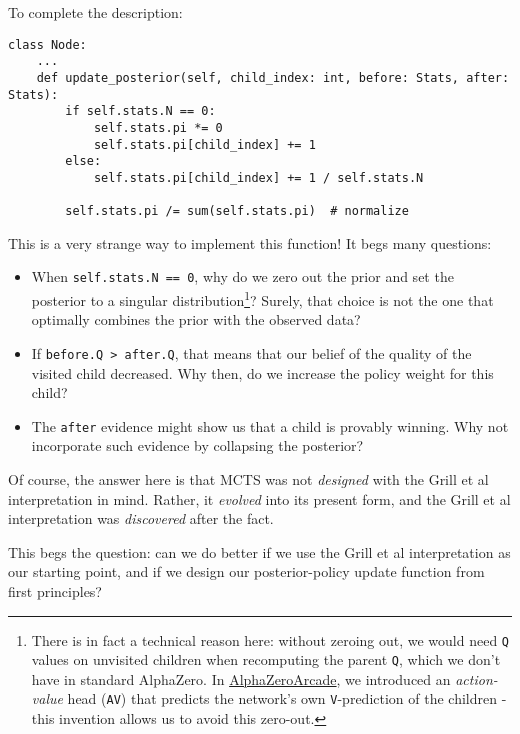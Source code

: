 \documentclass[tikz]{article}
\begin{document}
\newpage

To complete the description:

\begin{tcolorbox}
\begin{verbatim}
class Node:
    ...
    def update_posterior(self, child_index: int, before: Stats, after: Stats):
        if self.stats.N == 0:
            self.stats.pi *= 0
            self.stats.pi[child_index] += 1
        else:
            self.stats.pi[child_index] += 1 / self.stats.N

        self.stats.pi /= sum(self.stats.pi)  # normalize
\end{verbatim}
\end{tcolorbox}

This is a very strange way to implement this function! It begs many questions:

\begin{itemize}
    \item When \texttt{self.stats.N == 0}, why do we zero out the prior and set the posterior to a singular distribution\footnote{
    There is in fact a technical reason here: without zeroing out, we would need \texttt{Q} values on unvisited children when recomputing
    the parent \texttt{Q}, which we don't have in standard AlphaZero. In \href{https://github.com/shindavid/AlphaZeroArcade}{AlphaZeroArcade},
    we introduced an \emph{action-value} head (\texttt{AV}) that predicts the network's own \texttt{V}-prediction of the children - this invention
    allows us to avoid this zero-out.}?
    Surely, that choice is not the one that optimally combines the prior with the observed data?
    \item If \texttt{before.Q > after.Q}, that means that our belief of the quality of the visited child decreased. Why then, do we increase the policy weight for this child?
    \item The \texttt{after} evidence might show us that a child is provably winning. Why not incorporate such evidence by collapsing the posterior?
\end{itemize}

Of course, the answer here is that MCTS was not \textit{designed} with the Grill et al interpretation in mind. Rather, it \textit{evolved} into
its present form, and the Grill et al interpretation was \textit{discovered} after the fact. \newline

This begs the question: can we do better if we use the Grill et al interpretation as our starting point, and if we design our posterior-policy update
function from first principles?
\end{document}
